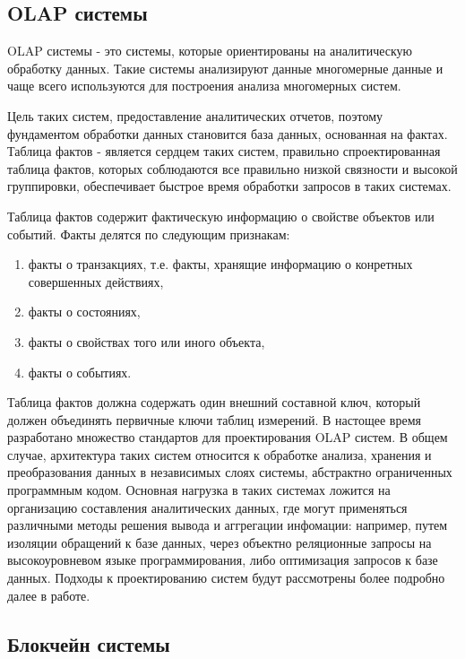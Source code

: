 \subsection{OLAP системы}\label{sec:ch2/sec1/sub3}

OLAP системы - это системы, которые ориентированы на аналитическую обработку данных. Такие системы анализируют данные многомерные данные и чаще всего используются для построения анализа многомерных систем.

Цель таких систем, предоставление аналитических отчетов, поэтому фундаментом обработки данных становится база данных, основанная на фактах. Таблица фактов - является сердцем таких систем, правильно спроектированная таблица фактов, которых соблюдаются все правильно низкой связности и высокой группировки, обеспечивает быстрое время обработки запросов в таких системах. 

Таблица фактов содержит фактическую информацию о свойстве объектов или событий. Факты делятся по следующим признакам:
\begin{enumerate}
	\item факты о транзакциях, т.е. факты, хранящие информацию о конретных совершенных действиях, 
	\item факты о состояниях,
	\item факты о свойствах того или иного объекта,
	\item факты о событиях.
\end{enumerate}

Таблица фактов должна содержать один внешний составной ключ, который должен объединять первичные ключи таблиц измерений. В настощее время разработано множество стандартов для проектирования OLAP систем. В общем случае, архитектура таких систем относится к обработке анализа, хранения и преобразования данных в независимых слоях системы, абстрактно ограниченных программным кодом. Основная нагрузка в таких системах ложится на организацию составления аналитических данных, где могут применяться различными методы решения вывода и аггрегации инфомации: например, путем изоляции обращений к базе данных, через объектно реляционные запросы на высокоуровневом языке программирования, либо оптимизация запросов к базе данных. 
Подходы к проектированию систем будут рассмотрены более подробно далее в работе.

\subsection{Блокчейн системы}\label{sec:ch2/sec1/sub4}

